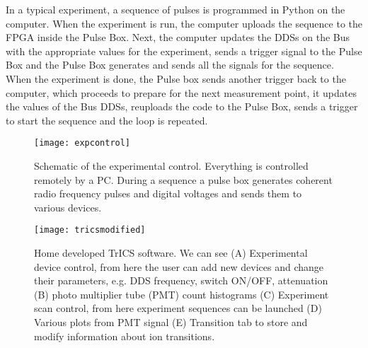 In a typical experiment, a sequence of pulses is programmed in Python on the computer. When the experiment is run, the computer uploads the sequence to the FPGA inside the Pulse Box. Next, the computer updates the DDSs on the Bus with the appropriate values for the experiment, sends a trigger signal to the Pulse Box and the Pulse Box generates and sends all the signals for the sequence. When the experiment is done, the Pulse box sends another trigger back to the computer, which proceeds to prepare for the next measurement point, it updates the values of the Bus DDSs, reuploads the code to the Pulse Box, sends a trigger to start the sequence and the loop is repeated.

\begin{figure}
\centering
\texttt{[image: expcontrol]}
\caption{Schematic of the experimental control. Everything is controlled remotely by a PC. During a sequence a pulse box generates coherent radio frequency pulses and digital voltages and sends them to various devices.}
\label{expcontrol}
\end{figure}

\begin{figure}
\centering
\texttt{[image: tricsmodified]}
\caption{Home developed TrICS software. We can see (A) Experimental device control, from here the user can add new devices and change their parameters, e.g. DDS frequency, switch ON/OFF, attenuation (B) photo multiplier tube (PMT) count histograms (C) Experiment scan control, from here experiment sequences can be launched (D) Various plots from PMT signal (E) Transition tab to store and modify information about ion transitions.}
\label{trics}
\end{figure}

